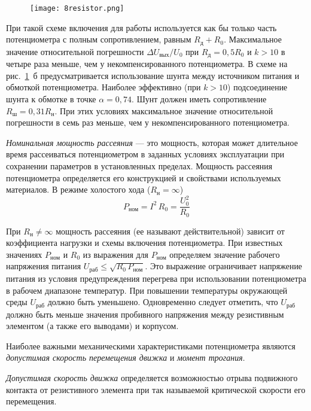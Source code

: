 \begin{figure}[h!]
	\caption{  }
	\texttt{[image: 8resistor.png]}
	\label{pic:8resistor}
\end{figure}

При такой схеме включения для работы используется как бы только часть потенциометра с полным сопротивлением, равным $ R_\text{д} + R_0 $. Максимальное значение относительной погрешности $ \Delta U_\text{вых}/U_0 $ при $ R_\text{д}=0,5R_0 $ и $ k > 10 $ в четыре раза меньше, чем у некомпенсированного потенциометра. В схеме на рис.~\ref{pic:8resistor}~б предусматривается использование шунта между источником питания и обмоткой потенциометра. Наиболее эффективно (при $ k > 10 $) подсоединение шунта к обмотке в точке $ \alpha = 0,74 $. Шунт должен иметь сопротивление $ R_\text{ш} = 0,31 R_\text{н} $. При этих условиях максимальное значение относительной погрешности в семь раз меньше, чем у некомпенсированного потенциометра.

\textit{Номинальная мощность рассеяния} --- это мощность, которая может длительное время рассеиваться потенциометром в заданных условиях эксплуатации при сохранении параметров в установленных пределах. Мощность рассеяния потенциометра определяется его конструкцией и свойствами используемых материалов. В режиме холостого хода ($ R_\text{н} = \infty $)   
\[ P_\text{ном} = I^2\,R_0 = \dfrac{U_0^2}{R_0}\]

При $ R_\text{н} \neq \infty $ мощность рассеяния (ее называют действительной) зависит от коэффициента нагрузки и схемы включения потенциометра. При известных значениях $ P_\text{ном} $ и $ R_0 $ из выражения для $ P_\text{ном} $ определяем значение рабочего напряжения питания $ U_\text{раб} \leq \sqrt{R_0\,P_\text{ном}} $. Это выражение ограничивает напряжение питания из условия предупреждения перегрева при использовании потенциометра в рабочем диапазоне температур. При повышении температуры окружающей среды $ U_\text{раб} $ должно быть уменьшено. Одновременно следует отметить, что $ U_\text{раб} $ должно быть меньше значения пробивного напряжения между резистивным элементом (а также его выводами) и корпусом.

Наиболее важными механическими характеристиками потенциометра являются \textit{допустимая скорость перемещения движка} и \textit{момент трогания}. 

\textit{Допустимая скорость движка} определяется возможностью отрыва подвижного контакта от резистивного элемента при так называемой критической скорости его перемещения.

